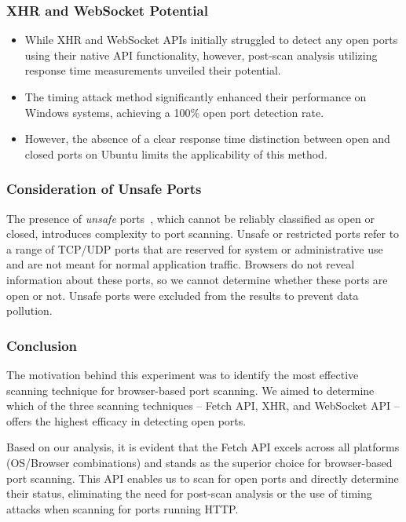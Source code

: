 \subsubsection{XHR and WebSocket Potential}

\begin{itemize}
    \item While XHR and WebSocket APIs initially struggled to detect any open ports using their native API functionality, however, post-scan analysis utilizing response time measurements unveiled their potential.
    \item The timing attack method significantly enhanced their performance on Windows systems, achieving a 100\% open port detection rate.
    \item However, the absence of a clear response time distinction between open and closed ports on Ubuntu limits the applicability of this method.
\end{itemize}

\subsubsection{Consideration of Unsafe Ports}

The presence of \emph{unsafe} ports~, which cannot be reliably classified as open or closed, introduces complexity to port scanning.
Unsafe or restricted ports refer to a range of TCP/UDP ports that are reserved for system or administrative use and are not meant for normal application traffic. Browsers do not reveal information about these ports, so we cannot determine whether these ports are open or not. Unsafe ports were excluded from the results to prevent data pollution.


\subsubsection{Conclusion}

The motivation behind this experiment was to identify the most effective scanning technique for browser-based port scanning. We aimed to determine which of the three scanning techniques -- Fetch API, XHR, and WebSocket API -- offers the highest efficacy in detecting open ports.

Based on our analysis, it is evident that the Fetch API excels across all platforms (OS/Browser combinations) and stands as the superior choice for browser-based port scanning. 
This API enables us to scan for open ports and directly determine their status, eliminating the need for post-scan analysis or the use of timing attacks when scanning for ports running HTTP.


